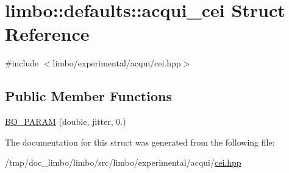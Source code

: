 \hypertarget{structlimbo_1_1defaults_1_1acqui__cei}{}\section{limbo\+:\+:defaults\+:\+:acqui\+\_\+cei Struct Reference}
\label{structlimbo_1_1defaults_1_1acqui__cei}


{\ttfamily \#include $<$limbo/experimental/acqui/cei.\+hpp$>$}

\subsection*{Public Member Functions}
\begin{DoxyCompactItemize}
\item 
\hyperlink{group__acqui__defaults_ga89ae5d0534c26df145a7d65eb7da7643}{B\+O\+\_\+\+P\+A\+R\+A\+M} (double, jitter, 0.)
\end{DoxyCompactItemize}


The documentation for this struct was generated from the following file\+:\begin{DoxyCompactItemize}
\item 
/tmp/doc\+\_\+limbo/limbo/src/limbo/experimental/acqui/\hyperlink{cei_8hpp}{cei.\+hpp}\end{DoxyCompactItemize}
